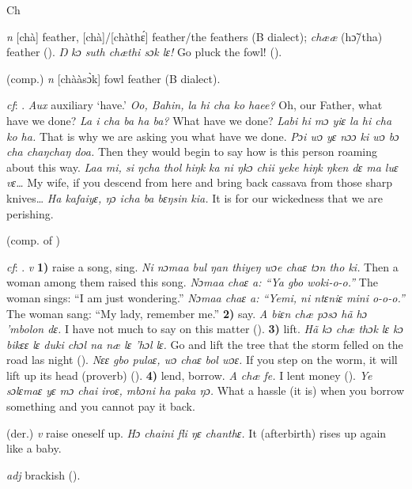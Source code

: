 \begin{letter}{Ch}

 \textit{n} [chà] feather, [chà]/[chàthɛ́] feather/the feathers (B dialect); \textit{chææ} (hɔ̃/tha) feather (\citealt{Pichl1967}). \textit{Ŋ kɔ suth chæthi sɔk lɛ!} Go pluck the fowl! (\citealt{Pichl1967}). 

 (comp.) \textit{n} [chààsɔ̀k] fowl feather (B dialect). 

 \textit{cf}: . \textit{Aux} auxiliary ‘have.' \textit{Oo, Bahin, la hi cha ko haee?} Oh, our Father, what have we done? \textit{La i cha ba ha ba?} What have we done? \textit{Labi hi mɔ yiɛ la hi cha ko ha.} That is why we are asking you what have we done. \textit{Pɔi wɔ yɛ nɔɔ ki wɔ bɔ cha chaŋchaŋ doa.} Then they would begin to say how is this person roaming about this way. \textit{Laa mi, si ŋcha thol hiŋk ka ni ŋkɔ chii yeke hiŋk ŋken dɛ ma luɛ vɛ…} My wife, if you descend from here and bring back cassava from those sharp knives… \textit{Ha kafaiyɛ, ŋɔ icha ba bɛŋsin kia.} It is for our wickedness that we are perishing.

 (comp. of )

 \textit{cf}: . \textit{v} \textbf{1)} raise a song, sing. \textit{Ni nɔmaa bul ŋan thiyeŋ wɔe chaɛ tɔn tho ki.} Then a woman among them raised this song. \textit{Nɔmaa chaɛ a: “Ya gbo woki-o-o.”} The woman sings: “I am just wondering.” \textit{Nɔmaa chaɛ a: “Yemi, ni ntɛniɛ mini o-o-o.”} The woman sang: “My lady, remember me.” \textbf{2)} say. \textit{A biɛn chæ pɔsɔ hã hɔ 'mbolon dɛ.} I have not much to say on this matter (\citealt{Pichl1967}). \textbf{3)} lift. \textit{Hã kɔ chæ thɔk lɛ kɔ bikɛɛ lɛ duki chɔl na næ lɛ 'hɔl lɛ.} Go and lift the tree that the storm felled on the road las night (\citealt{Pichl1967}). \textit{Nɛɛ gbo pulaɛ, wɔ chaɛ bol wɔɛ.} If you step on the worm, it will lift up its head (proverb) (\citealt{TISLL1979}). \textbf{4)} lend, borrow. \textit{A chæ fe.} I lent money (\citealt{Pichl1967}). \textit{Ye sɔlɛmaɛ yɛ mɔ chai iroɛ, mbɔni ha paka ŋɔ.} What a hassle (it is) when you borrow something and you cannot pay it back.

 (der.) \textit{v} raise oneself up. \textit{Hɔ chaini fli ŋɛ chanthɛ.} It (afterbirth) rises up again like a baby.

 \textit{adj} brackish (\citealt{Pichl1967}). 


\end{letter}
